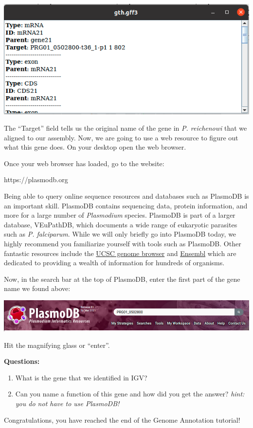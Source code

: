 \documentclass[11pt]{article}
\providecommand{\tightlist}{%
      \setlength{\itemsep}{0pt}\setlength{\parskip}{0pt}}
\begin{document}
\includegraphics{images/comparative_4.png}

The ``Target'' field tells us the original name of the gene in \textit{P.
reichenowi} that we aligned to our assembly. Now, we are going to use a
web resource to figure out what this gene does. On your desktop open the
web browser.

Once your web browser has loaded, go to the website:

https://plasmodb.org

Being able to query online sequence resources and databases such as
PlasmoDB is an important skill. PlasmoDB contains sequencing data,
protein information, and more for a large number of \textit{Plasmodium}
species. PlasmoDB is part of a larger database, VEuPathDB, which
documents a wide range of eukaryotic parasites such as \textit{P.
falciparum}. While we will only briefly go into PlasmoDB today, we
highly recommend you familiarize yourself with tools such as PlasmoDB.
Other fantastic resources include the
\href{https://genome.ucsc.edu/}{UCSC genome browser} and
\href{https://www.ensembl.org/index.html}{Ensembl} which are dedicated
to providing a wealth of information for hundreds of organisms.

Now, in the search bar at the top of PlasmoDB, enter the first part of
the gene name we found above:

\includegraphics{images/comparative_6.png}

Hit the magnifying glass or ``enter''.

\textbf{Questions:}

\begin{enumerate}
\def\labelenumi{\arabic{enumi}.}
\tightlist
\item
  What is the gene that we identified in IGV?
\item
  Can you name a function of this gene and how did you get the answer?
  \textit{hint: you do not have to use PlasmoDB!}
\end{enumerate}

Congratulations, you have reached the end of the Genome Annotation
tutorial!


\end{document}
